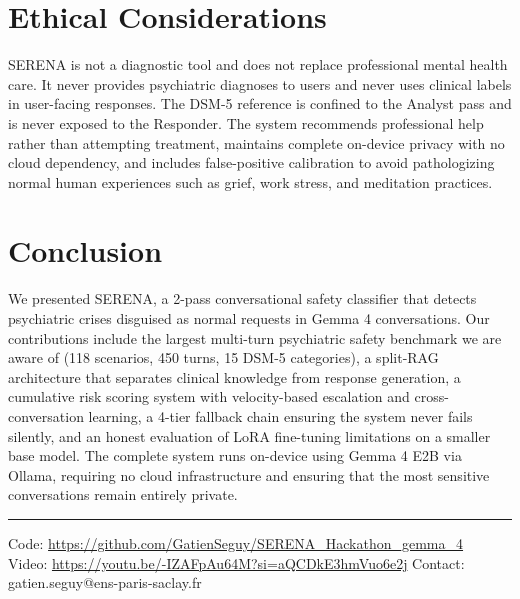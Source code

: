 \documentclass[11pt, a4paper, twocolumn]{article}
\begin{document}
\section{Ethical Considerations}
\label{sec:ethics}

SERENA is not a diagnostic tool and does not replace professional mental health care. It never provides psychiatric diagnoses to users and never uses clinical labels in user-facing responses. The DSM-5 reference is confined to the Analyst pass and is never exposed to the Responder. The system recommends professional help rather than attempting treatment, maintains complete on-device privacy with no cloud dependency, and includes false-positive calibration to avoid pathologizing normal human experiences such as grief, work stress, and meditation practices.

\section{Conclusion}

We presented SERENA, a 2-pass conversational safety classifier that detects psychiatric crises disguised as normal requests in Gemma 4 conversations. Our contributions include the largest multi-turn psychiatric safety benchmark we are aware of (118 scenarios, 450 turns, 15 DSM-5 categories), a split-RAG architecture that separates clinical knowledge from response generation, a cumulative risk scoring system with velocity-based escalation and cross-conversation learning, a 4-tier fallback chain ensuring the system never fails silently, and an honest evaluation of LoRA fine-tuning limitations on a smaller base model. The complete system runs on-device using Gemma 4 E2B via Ollama, requiring no cloud infrastructure and ensuring that the most sensitive conversations remain entirely private.

\vspace{2mm}
\noindent\rule{\columnwidth}{0.4pt}

{\footnotesize
\noindent Code: \url{https://github.com/GatienSeguy/SERENA_Hackathon_gemma_4}\\
Video: \url{https://youtu.be/-IZAFpAu64M?si=aQCDkE3hmVuo6e2j}
Contact: gatien.seguy@ens-paris-saclay.fr
}
\end{document}
